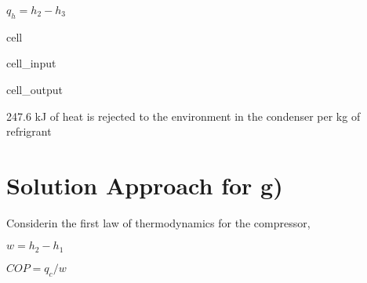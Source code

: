 \documentclass[letterpaper,10pt,english]{jupyterBook}
\begin{document}
\sphinxAtStartPar
\(q_h=h_2-h_3\)

\begin{sphinxuseclass}{cell}\begin{sphinxVerbatimInput}

\begin{sphinxuseclass}{cell_input}
\begin{sphinxVerbatim}[commandchars=\\\{\}]
    
 
\end{sphinxVerbatim}

\end{sphinxuseclass}\end{sphinxVerbatimInput}
\begin{sphinxVerbatimOutput}

\begin{sphinxuseclass}{cell_output}
\begin{sphinxVerbatim}[commandchars=\\\{\}]
247.6 kJ of heat is rejected to the environment in the condenser per kg of refrigrant
\end{sphinxVerbatim}

\end{sphinxuseclass}\end{sphinxVerbatimOutput}

\end{sphinxuseclass}

\section{Solution Approach for g)}
\label{\detokenize{notebooks/Chapter5/CH5-Q5:solution-approach-for-g}}
\sphinxAtStartPar
Considerin the first law of thermodynamics for the compressor,

\sphinxAtStartPar
\(w=h_2-h_1\)

\sphinxAtStartPar
\(COP=q_c/w\)
\end{document}
